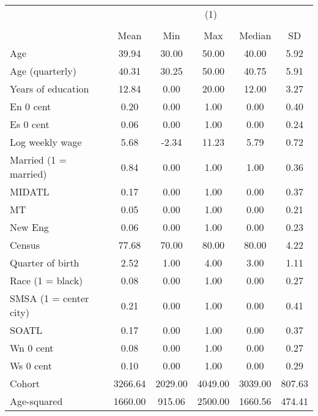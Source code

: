 {
\def\sym#1{\ifmmode^{#1}\else\(^{#1}\)\fi}
\begin{tabular}{l*{1}{ccccc}}
\hline\hline
                    &\multicolumn{5}{c}{(1)}                                         \\
                    &\multicolumn{5}{c}{}                                            \\
                    &        Mean&         Min&         Max&      Median&          SD\\
\hline
Age                 &       39.94&       30.00&       50.00&       40.00&        5.92\\
Age (quarterly)     &       40.31&       30.25&       50.00&       40.75&        5.91\\
Years of education  &       12.84&        0.00&       20.00&       12.00&        3.27\\
En 0 cent           &        0.20&        0.00&        1.00&        0.00&        0.40\\
Es 0 cent           &        0.06&        0.00&        1.00&        0.00&        0.24\\
Log weekly wage     &        5.68&       -2.34&       11.23&        5.79&        0.72\\
Married (1 = married)&        0.84&        0.00&        1.00&        1.00&        0.36\\
MIDATL              &        0.17&        0.00&        1.00&        0.00&        0.37\\
MT                  &        0.05&        0.00&        1.00&        0.00&        0.21\\
New Eng             &        0.06&        0.00&        1.00&        0.00&        0.23\\
Census              &       77.68&       70.00&       80.00&       80.00&        4.22\\
Quarter of birth    &        2.52&        1.00&        4.00&        3.00&        1.11\\
Race (1 = black)    &        0.08&        0.00&        1.00&        0.00&        0.27\\
SMSA (1 = center city)&        0.21&        0.00&        1.00&        0.00&        0.41\\
SOATL               &        0.17&        0.00&        1.00&        0.00&        0.37\\
Wn 0 cent           &        0.08&        0.00&        1.00&        0.00&        0.27\\
Ws 0 cent           &        0.10&        0.00&        1.00&        0.00&        0.29\\
Cohort              &     3266.64&     2029.00&     4049.00&     3039.00&      807.63\\
Age-squared         &     1660.00&      915.06&     2500.00&     1660.56&      474.41\\
\hline\hline
\end{tabular}
}
